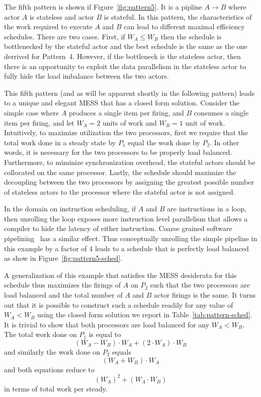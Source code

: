 The fifth pattern is shown if Figure~\ref{fig:pattern5}. It is a
pipline $A\rightarrow B$ where actor $A$ is stateless and actor $B$ is
stateful. In this pattern, the characteristics of the work required to
execute $A$ and $B$ can lead to different maximal efficiency schedules.
There are two cases. First, if $W_A \le W_B$ then the schedule is
bottlenecked by the stateful actor and the best schedule is the same
as the one derrived for Pattern~4. However, if the bottleneck is the
stateless actor, then there is an opportunity to exploit the data
parallelism in the stateless actor to fully hide the load imbalance
between the two actors.

This fifth pattern (and as will be apparent shortly in the following
pattern) leads to a unique and elegant MESS that has a closed form
solution. Consider the simple case where $A$ produces a single item
per firing, and $B$ consumes a single item per firing, and let $W_A =
2$ units of work and $W_B = 1$ unit of work. Intuitively, to maximize
utilization the two processors, first we require that the total work
done in a steady state by $P_1$ equal the work done by $P_2$. In other
words, it is necessary for the two processors to be properly load
balanced. Furthermore, to miminize synchronization overhead, the
stateful actors should be collocated on the same processor. Lastly,
the schedule should maximize the decoupling between the two processors
by assigning the greatest possible number of stateless actors to the
processor where the stateful actor is not assigned.

In the domain on instruction scheduling, if $A$ and $B$ are
instructions in a loop, then unrolling the loop exposes more
instruction level parallelism that allows a compiler to hide the
latency of either instruction. Coarse grained software
pipelining~\cite{mgordon-aplos06} has a similar effect. Thus
conceptually unrolling the simple pipeline in this example by a factor
of 4 leads to a schedule that is perfectly load balanced as show in
Figure~\ref{fig:pattern5-sched}. 

A generalization of this example that satisfies the MESS desiderata
for this schedule thus maximizes the firings of $A$ on $P_2$ such that
the two processors are load balanced and the total number of $A$ and
$B$ actor firings is the same. It turns out that it is possible to
construct such a schedule readily for any value of $W_A < W_B$ using
the closed form solution we report in
Table~\ref{tab:pattern-sched}. It is trivial to show that both
processors are load balanced for any $W_A < W_B$. The total work done
on $P_1$ is equal to
\[
(W_A - W_B) \cdot W_A + (2 \cdot W_A) \cdot W_B
\]
and similarly the work done on $P_2$ equals
\[
(W_A + W_B) \cdot W_A
\]
and both equations reduce to 
\[
(W_A)^2 + (W_A \cdot W_B)
\]
in terms of total work per steady.

